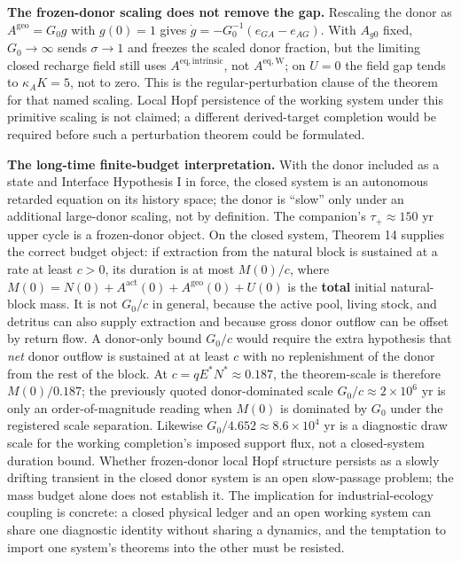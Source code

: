 \documentclass[11pt]{article}
\begin{document}
\textbf{The frozen-donor scaling does not remove the gap.} Rescaling the donor as \(A^{\mathrm{geo}}=G_0g\) with \(g(0)=1\) gives \(\dot g=-G_0^{-1}(e_{GA}-e_{AG})\). With \(A_{g0}\) fixed, \(G_0\to\infty\) sends \(\sigma\to1\) and freezes the scaled donor fraction, but the limiting closed recharge field still uses \(A^{\mathrm{eq,intrinsic}}\), not \(A^{\mathrm{eq,W}}\); on \(U=0\) the field gap tends to \(\kappa_AK=5\), not to zero. This is the regular-perturbation clause of the theorem for that named scaling. Local Hopf persistence of the working system under this primitive scaling is not claimed; a different derived-target completion would be required before such a perturbation theorem could be formulated.

\textbf{The long-time finite-budget interpretation.} With the donor included as a state and Interface Hypothesis I in force, the closed system is an autonomous retarded equation on its history space; the donor is ``slow'' only under an additional large-donor scaling, not by definition. The companion's \(\tau_+ \approx 150\) yr upper cycle is a frozen-donor object. On the closed system, Theorem 14 supplies the correct budget object: if extraction from the natural block is sustained at a rate at least \(c>0\), its duration is at most \(M(0)/c\), where \(M(0)=N(0)+A^{\mathrm{act}}(0)+A^{\mathrm{geo}}(0)+U(0)\) is the \textbf{total} initial natural-block mass. It is not \(G_0/c\) in general, because the active pool, living stock, and detritus can also supply extraction and because gross donor outflow can be offset by return flow. A donor-only bound \(G_0/c\) would require the extra hypothesis that \emph{net} donor outflow is sustained at at least \(c\) with no replenishment of the donor from the rest of the block. At \(c=qE^*N^*\approx0.187\), the theorem-scale is therefore \(M(0)/0.187\); the previously quoted donor-dominated scale \(G_0/c\approx2\times10^6\) yr is only an order-of-magnitude reading when \(M(0)\) is dominated by \(G_0\) under the registered scale separation. Likewise \(G_0/4.652\approx8.6\times10^4\) yr is a diagnostic draw scale for the working completion's imposed support flux, not a closed-system duration bound. Whether frozen-donor local Hopf structure persists as a slowly drifting transient in the closed donor system is an open slow-passage problem; the mass budget alone does not establish it. The implication for industrial-ecology coupling is concrete: a closed physical ledger and an open working system can share one diagnostic identity without sharing a dynamics, and the temptation to import one system's theorems into the other must be resisted.
\end{document}
